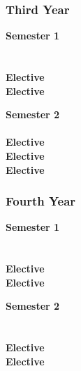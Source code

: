 \subsubsection{Third Year}
\begin{center}
\begin{multicols}{2}
\textbf{Semester 1} \\
 \\
 \\
\textbf{Elective} \\
\textbf{Elective} \\
\vfill
\columnbreak

\textbf{Semester 2} \\
 \\
\textbf{Elective} \\
\textbf{Elective} \\
\textbf{Elective} \\
\end{multicols}
\end{center}

\subsubsection{Fourth Year}
\begin{center}
\begin{multicols}{2}
\textbf{Semester 1} \\
 \\
 \\
\textbf{Elective} \\
\textbf{Elective} \\
\vfill
\columnbreak

\textbf{Semester 2} \\
 \\
 \\
\textbf{Elective} \\
\textbf{Elective} \\
\end{multicols}
\end{center}

